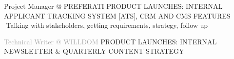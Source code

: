 \begin{cvtable}
{{Project Manager
\newline
@
{P\scriptsize REFERATI}
}}%
{
}%
{%
    {\scriptsize PRODUCT LAUNCHES:
    INTERNAL APPLICANT TRACKING SYSTEM [ATS], %
    CRM AND CMS FEATURES
    } \\
     \textperiodcentered $ $ Talking with stakeholders, %
     getting requirements, strategy, follow up \\  %
} 

{\textcolor{darkgray}{%
    Technical Writer \newline @
{W\scriptsize ILL}{D\scriptsize OM}
    }}%
{
}%
{%
{\scriptsize PRODUCT LAUNCHES:
INTERNAL NEWSLETTER \& QUARTERLY CONTENT STRATEGY
} \\
} 


\end{cvtable}
